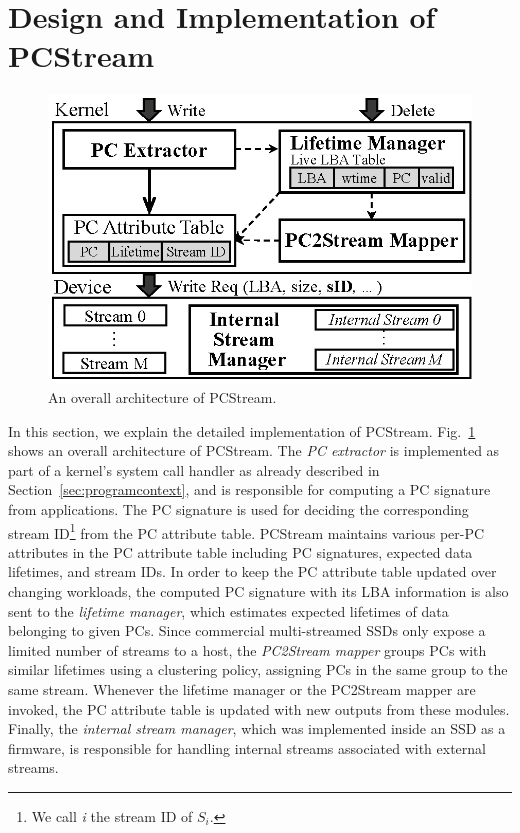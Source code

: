 \section{Design and Implementation of \textsf{PCStream}}

\begin{figure}[t]
	\centering
	\includegraphics[width=0.8\linewidth]{figure/pcstream/overview_1}
	\caption{An overall architecture of \textsf{\small PCStream}.}
	\label{fig:architecture}
\end{figure}


In this section, we explain the detailed implementation of \textsf{\small
PCStream}.  Fig.~\ref{fig:architecture} shows an overall architecture of
\textsf{\small PCStream}. The \textit{PC extractor} is implemented as part of a
kernel's system call handler as already described in
Section~\ref{sec:programcontext}, and is responsible for computing a PC
signature from applications.  The PC signature is used for deciding the
corresponding stream ID\footnote{ We call {\it i} the stream ID of $S_i$.} from
the PC attribute table.  \textsf{\small PCStream} maintains various per-PC
attributes in the PC attribute table including PC signatures, expected data
lifetimes, and stream IDs.  In order to keep the PC attribute table updated
over changing workloads, the computed PC signature with its LBA information is
also sent to the {\it lifetime manager}, which estimates expected lifetimes of
data belonging to given PCs.  Since commercial multi-streamed SSDs only expose
a limited number of streams to a host, the \textit{PC2Stream mapper} groups PCs
with similar lifetimes using a clustering policy, assigning PCs in the same
group to the same stream.  Whenever the lifetime manager or the PC2Stream
mapper are invoked, the PC attribute table is updated with new outputs from
these modules.  Finally, the \textit{internal stream manager}, 
which was implemented inside an SSD as a firmware, is responsible for
handling internal streams associated with external streams.


